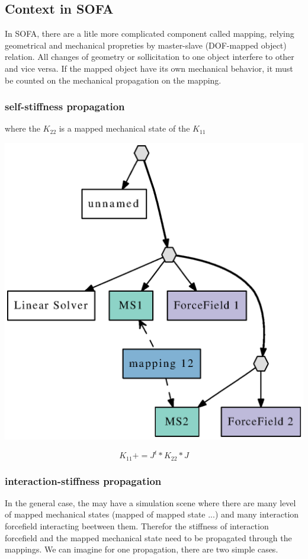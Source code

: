 \documentclass[a4paper,10pt]{article}
\begin{document}
\subsection{Context in SOFA }
In SOFA, there are a litle more complicated component called mapping, relying geometrical and mechanical propreties by master-slave (DOF-mapped object) relation. All changes of geometry or sollicitation to one object interfere to other and vice versa. If the mapped object have its own mechanical behavior, it must be counted on the mechanical propagation on the mapping.
\subsubsection{self-stiffness propagation }
where the $K_{22}$ is a mapped mechanical state of the $K_{11}$
\begin{center}
\includegraphics[scale=0.3]{stiffness_propagation}
\end{center}
\[
 K_{11} += J^t * K_{22} * J
\]
\subsubsection{interaction-stiffness propagation }
In the general case, the may have a simulation scene where there are many level of mapped mechanical states (mapped of mapped state ...) and many interaction forcefield interacting beetween them. Therefor the stiffness of interaction forcefield and the mapped mechanical state need to be propagated through the mappings. We can imagine for one propagation, there are two simple cases.
\end{document}
